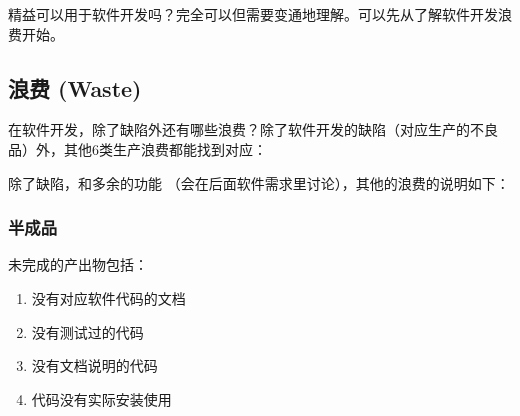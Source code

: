 精益可以用于软件开发吗？完全可以但需要变通地理解。可以先从了解软件开发浪费开始。

\hypertarget{ux6d6aux8d39-waste}{%
\subsection{浪费 (Waste)}\label{ux6d6aux8d39-waste}}

在软件开发，除了缺陷外还有哪些浪费？除了软件开发的缺陷（对应生产的不良品）外，其他6类生产浪费都能找到对应：










除了缺陷，和多余的功能
（会在后面软件需求里讨论），其他的浪费的说明如下：

\hypertarget{ux534aux6210ux54c1}{%
\subsubsection{半成品}\label{ux534aux6210ux54c1}}

未完成的产出物包括：

\begin{enumerate}
\tightlist
\item
  没有对应软件代码的文档
\item
  没有测试过的代码
\item
  没有文档说明的代码
\item
  代码没有实际安装使用
\end{enumerate}

